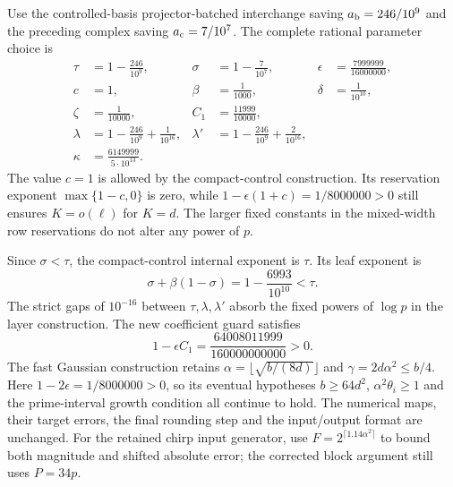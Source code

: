 Use the controlled-basis projector-batched interchange saving
$a_{\rm b}=246/10^9$ and the preceding complex saving $a_{\rm c}=7/10^7$.
The complete rational parameter choice is
\[
\begin{aligned}
 \tau&=1-\frac{246}{10^9},&
 \sigma&=1-\frac7{10^7},&
 \epsilon&=\frac{7999999}{16000000},\\
 c&=1,& \beta&=\frac1{1000},& \delta&=\frac1{10^{10}},\\
 \zeta&=\frac1{10000},& C_1&=\frac{11999}{10000},\\
 \lambda&=1-\frac{246}{10^9}+\frac1{10^{16}},&
 \lambda'&=1-\frac{246}{10^9}+\frac2{10^{16}},\\
 \kappa&=\frac{6149999}{5\cdot10^{13}}.
\end{aligned}
\]
The value $c=1$ is allowed by the compact-control construction. Its
reservation exponent $\max\{1-c,0\}$ is zero, while
$1-\epsilon(1+c)=1/8000000>0$ still ensures $K=o(\ell)$ for $K=d$.
The larger fixed constants in the mixed-width row reservations do not
alter any power of $p$.

Since $\sigma<\tau$, the compact-control internal exponent is $\tau$.
Its leaf exponent is
\[
 \sigma+\beta(1-\sigma)=1-\frac{6993}{10^{10}}<\tau.
\]
The strict gaps of $10^{-16}$ between $\tau,\lambda,\lambda'$ absorb
the fixed powers of $\log p$ in the layer construction. The new
coefficient guard satisfies
\[
 1-\epsilon C_1=\frac{64008011999}{160000000000}>0.
\]
The fast Gaussian construction retains
$\alpha=\lfloor\sqrt{b/(8d)}\rfloor$ and $\gamma=2d\alpha^2\le b/4$.
Here $1-2\epsilon=1/8000000>0$, so its eventual hypotheses
$b\ge64d^2$, $\alpha^2\theta_i\ge1$ and the prime-interval growth
condition all continue to hold. The numerical maps, their target errors,
the final rounding step and the input/output format are unchanged.
For the retained chirp input generator, use
$F=2^{\lceil1.14\alpha^2\rceil}$ to bound both magnitude and shifted
absolute error; the corrected block argument still uses $P=34p$.

